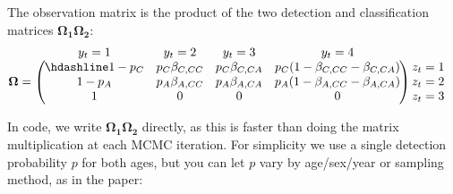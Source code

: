 \documentclass[
  12pt,
]{krantz}
\begin{document}
The observation matrix is the product of the two detection and classification matrices \(\mathbf{\Omega_1} \mathbf{\Omega_2}\):
\[\begin{matrix}
& \\
\mathbf{\Omega} =
    \left ( \vphantom{ \begin{matrix} 12 \\ 12 \\ 12\end{matrix} } \right .
\end{matrix}
\hspace{-1.2em}
\begin{matrix}
    y_t=1 & y_t=2 & y_t=3 & y_t=4\\ \hdashline
1-p_C & p_C \beta_{C,CC} & p_C \beta_{C,CA} & p_C (1 - \beta_{C,CC} - \beta_{C,CA})\\
1-p_A & p_A \beta_{A,CC} & p_A \beta_{A,CA} & p_A (1 - \beta_{A,CC} - \beta_{A,CA})\\
1 & 0 & 0 & 0\\
\end{matrix}
\hspace{-0.2em}
\begin{matrix}
& \\
\left . \vphantom{ \begin{matrix} 12 \\ 12 \\ 12\end{matrix} } \right )
    \begin{matrix}
    z_{t}=1 \\ z_{t}=2 \\ z_{t}=3
    \end{matrix}
\end{matrix}\]

In code, we write \(\mathbf{\Omega_1} \mathbf{\Omega_2}\) directly, as this is faster than doing the matrix multiplication at each MCMC iteration. For simplicity we use a single detection probability \(p\) for both ages, but you can let \(p\) vary by age/sex/year or sampling method, as in the paper:
\end{document}
